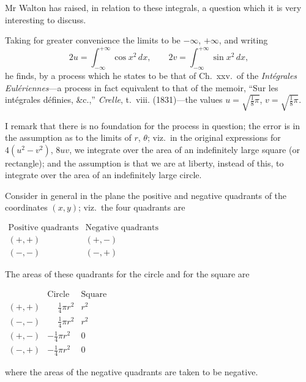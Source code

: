 \documentclass[11pt,a4paper]{book}
\begin{document}

Mr Walton has raised, in relation to these integrals, a question which it is very interesting to discuss.

Taking for greater convenience the limits to be $-\infty$, $+\infty$, and writing
\[
2u = \int_{-\infty}^{+\infty} \cos x^2\,dx, \qquad 2v = \int_{-\infty}^{+\infty} \sin x^2\,dx,
\]
he finds, by a process which he states to be that of Ch.~xxv.\ of the \textit{Int\'egrales Eul\'eriennes}---a process in fact equivalent to that of the memoir, ``Sur les int\'egrales d\'efinies, \&c.,'' \textit{Crelle}, t.~viii. (1831)---the values $u = \sqrt{\frac{1}{8}\pi}$, $v = \sqrt{\frac{1}{8}\pi}$.

I remark that there is no foundation for the process in question; the error is in the assumption as to the limits of $r$, $\theta$; viz.\ in the original expressions for $4(u^2 - v^2)$, $8uv$, we integrate over the area of an indefinitely large square (or rectangle); and the assumption is that we are at liberty, instead of this, to integrate over the area of an indefinitely large circle.

Consider in general in the plane the positive and negative quadrants of the coordinates $(x,y)$; viz.\ the four quadrants are
\begin{center}
$\begin{array}{c|c}
\text{Positive quadrants} & \text{Negative quadrants} \\
\hline
(+,+) & (+,-) \\
(-,-) & (-,+)
\end{array}$
\end{center}

\newpage

The areas of these quadrants for the circle and for the square are
\begin{center}
$\begin{array}{c|cc}
& \text{Circle} & \text{Square} \\
\hline
(+,+) & \phantom{-}\frac{1}{4}\pi r^2 & r^2 \\
(-,-) & \phantom{-}\frac{1}{4}\pi r^2 & r^2 \\
(+,-) & -\frac{1}{4}\pi r^2 & 0 \\
(-,+) & -\frac{1}{4}\pi r^2 & 0
\end{array}$
\end{center}
where the areas of the negative quadrants are taken to be negative.
\end{document}
